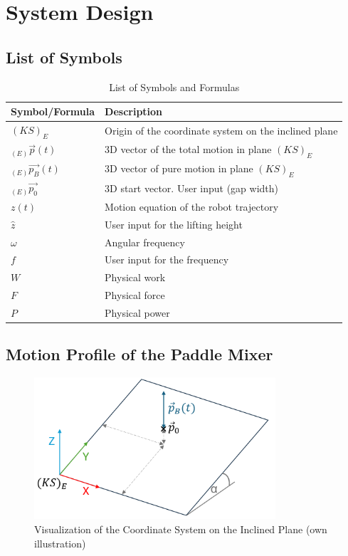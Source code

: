 \chapter{System Design}
\label{sec:SystemDesign}

\section{List of Symbols}


\begin{table}[htbp]
    \centering
    \begin{tabular}{l l}
        \hline
        \textbf{Symbol/Formula} & \textbf{Description} \\
        \hline
        \((KS)_E\) & Origin of the coordinate system on the inclined plane \\
        \( _{(E)}\vec{p}(t) \) & 3D vector of the total motion in plane \((KS)_E\)\\
        \(_{(E)}\vec{p_B} (t) \) & 3D vector of pure motion in plane \((KS)_E\) \\
        \(_{(E)}\vec{p_0}\) & 3D start vector. User input (gap width)\\
        \(z(t)\) & Motion equation of the robot trajectory \\
        \(\hat{z}\) & User input for the lifting height\\
        \(\omega\) & Angular frequency \\
        \(f\) & User input for the frequency \\
        \(W\) & Physical work \\
        \(F\) & Physical force \\
        \(P\) & Physical power \\
        \hline
    \end{tabular}
    \caption{List of Symbols and Formulas}
\end{table}

\section{Motion Profile of the Paddle Mixer}\label{sec:Motion Profile of the Paddle Mixer}


\begin{figure}[h]
    \centering
    \includegraphics[width=0.8\textwidth]{bilder/KS_E-Koordinatensystem_Ebene.png}
    \caption[Visualization of the Coordinate System on the Inclined Plane]{Visualization of the Coordinate System on the Inclined Plane (own illustration)}\label{fig:VisualizationCoordinateSystemInclinedPlane}
\end{figure}

